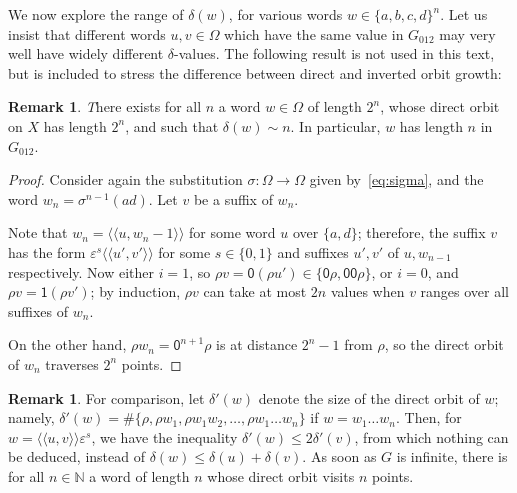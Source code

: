 \documentclass{amsart}
\newcommand\N{\mathbb{N}}
\newcommand\Grig{{G_{012}}}
\def\pair<#1>{{\langle\!\langle}#1{\rangle\!\rangle}}
\theoremstyle{definition}
\newtheorem{remark}[lemma]{Remark}
\begin{document}
We now explore the range of $\delta(w)$, for various words
$w\in\{a,b,c,d\}^n$. Let us insist that different words $u,v\in
\Omega$ which have the same value in $\Grig$ may very well have widely
different $\delta$-values. The following result is not used in this
text, but is included to stress the difference between direct and
inverted orbit growth:
\begin{remark}\label{rem:invdir}
  \textit There exists for all $n$ a word $w\in \Omega$ of length
  $2^n$, whose direct orbit on $X$ has length $2^n$, and such that
  $\delta(w)\sim n$. In particular, $w$ has length $n$ in $\Grig$.
\end{remark}
\begin{proof}
  Consider again the substitution $\sigma:\Omega\to \Omega$ given
  by~\eqref{eq:sigma}, and the word $w_n=\sigma^{n-1}(ad)$. Let $v$ be
  a suffix of $w_n$.

  Note that $w_n=\pair<u,w_{n-1}>$ for some word $u$ over $\{a,d\}$;
  therefore, the suffix $v$ has the form $\varepsilon^s\pair<u',v'>$
  for some $s\in\{0,1\}$ and suffixes $u',v'$ of $u,w_{n-1}$
  respectively. Now either $i=1$, so $\rho v=\mathsf0(\rho
  u')\in\{\mathsf0\rho,\mathsf{00}\rho\}$, or $i=0$, and $\rho
  v=\mathsf1(\rho v')$; by induction, $\rho v$ can take at most $2n$
  values when $v$ ranges over all suffixes of $w_n$.

  On the other hand, $\rho w_n=\mathsf0^{n+1}\rho$ is at distance
  $2^n-1$ from $\rho$, so the direct orbit of $w_n$ traverses $2^n$
  points.
\end{proof}

\begin{remark}
  For comparison, let $\delta'(w)$ denote the size of the direct orbit
  of $w$; namely, $\delta'(w)=\#\{\rho,\rho w_1,\rho w_1w_2,\dots,\rho
  w_1\dots w_n\}$ if $w=w_1\dots w_n$. Then, for
  $w=\pair<u,v>\varepsilon^s$, we have the inequality
  $\delta'(w)\le2\delta'(v)$, from which nothing can be deduced,
  instead of $\delta(w)\le\delta(u)+\delta(v)$. As soon as $G$ is
  infinite, there is for all $n\in\N$ a word of length $n$ whose
  direct orbit visits $n$ points.
\end{remark}
\end{document}
